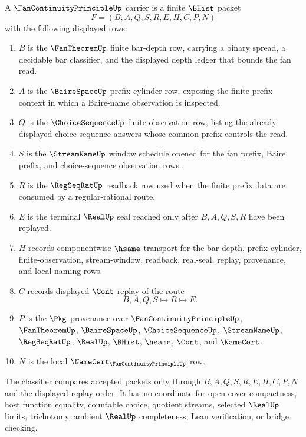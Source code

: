 \begin{definition}
\label{def:fan-continuity-principle-carrier}
A $\FanContinuityPrincipleUp$ carrier is a finite $\BHist$ packet
$$
F=(B,A,Q,S,R,E,H,C,P,N)
$$
with the following displayed rows:
\begin{enumerate}
\item $B$ is the $\FanTheoremUp$ finite bar-depth row, carrying a binary spread, a decidable bar classifier, and the displayed depth ledger that bounds the fan read.
\item $A$ is the $\BaireSpaceUp$ prefix-cylinder row, exposing the finite prefix context in which a Baire-name observation is inspected.
\item $Q$ is the $\ChoiceSequenceUp$ finite observation row, listing the already displayed choice-sequence answers whose common prefix controls the read.
\item $S$ is the $\StreamNameUp$ window schedule opened for the fan prefix, Baire prefix, and choice-sequence observation rows.
\item $R$ is the $\RegSeqRatUp$ readback row used when the finite prefix data are consumed by a regular-rational route.
\item $E$ is the terminal $\RealUp$ seal reached only after $B,A,Q,S,R$ have been replayed.
\item $H$ records componentwise $\hsame$ transport for the bar-depth, prefix-cylinder, finite-observation, stream-window, readback, real-seal, replay, provenance, and local naming rows.
\item $C$ records displayed $\Cont$ replay of the route
$$
B,A,Q,S \longmapsto R \longmapsto E .
$$
\item $P$ is the $\Pkg$ provenance over $\FanContinuityPrincipleUp$, $\FanTheoremUp$, $\BaireSpaceUp$, $\ChoiceSequenceUp$, $\StreamNameUp$, $\RegSeqRatUp$, $\RealUp$, $\BHist$, $\hsame$, $\Cont$, and $\NameCert$.
\item $N$ is the local $\NameCert_{\FanContinuityPrincipleUp}$ row.
\end{enumerate}
The classifier compares accepted packets only through $B,A,Q,S,R,E,H,C,P,N$ and the displayed replay order. It has no coordinate for open-cover compactness, host function equality, countable choice, quotient streams, selected $\RealUp$ limits, trichotomy, ambient $\RealUp$ completeness, Lean verification, or bridge checking.
\end{definition}

